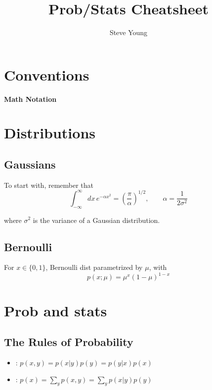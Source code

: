 \documentclass[11pt]{article}
\title{Prob/Stats Cheatsheet}
\author{Steve Young}
\begin{document}
\maketitle

\section{Conventions}
\paragraph{Math Notation}



\section{Distributions}
\subsection{Gaussians}
To start with, remember that
\begin{equation}
  \int_{-\infty}^{\infty} dx \, e^{-\alpha x^2} = \left(\frac{\pi}{\alpha}\right)^{1/2},
  \qquad \alpha = \frac{1}{2 \sigma^2} 
\end{equation}

\noindent where $\sigma^2$ is the variance of a Gaussian distribution.

\subsection{Bernoulli}
For $x \in \{0, 1\}$, Bernoulli dist parametrized by $\mu$, with
\begin{equation}
  p(x; \mu) = \mu^x (1-\mu)^{1-x}
\end{equation}


\section{Prob and stats}
\subsection{The Rules of Probability}
\begin{itemize}
  \item {}: $p(x, y) = p(x|y) p(y) = p(y|x) p(x)$
  \item {}: $p(x) = \sum\limits_y p(x, y) = \sum\limits_y p(x | y) p(y)$
\end{itemize}
\end{document}

